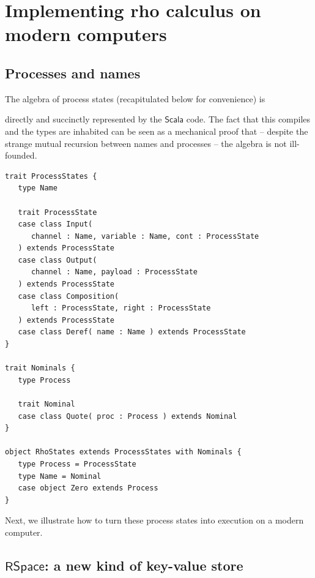 \section{Implementing rho calculus on modern computers}

\subsection{Processes and names}
The algebra of process states (recapitulated below for convenience) is 


directly and succinctly represented by the $\mathsf{Scala}$ code. The
fact that this compiles and the types are inhabited can be seen as a
mechanical proof that -- despite the strange mutual recursion between
names and processes -- the algebra is not ill-founded. 

\begin{lstlisting}
trait ProcessStates {
   type Name

   trait ProcessState
   case class Input(
      channel : Name, variable : Name, cont : ProcessState
   ) extends ProcessState
   case class Output(
      channel : Name, payload : ProcessState
   ) extends ProcessState
   case class Composition(
      left : ProcessState, right : ProcessState
   ) extends ProcessState
   case class Deref( name : Name ) extends ProcessState
}

trait Nominals {
   type Process

   trait Nominal
   case class Quote( proc : Process ) extends Nominal
}

object RhoStates extends ProcessStates with Nominals {
   type Process = ProcessState
   type Name = Nominal
   case object Zero extends Process
}
\end{lstlisting}

Next, we illustrate how to turn these process states into execution on
a modern computer.

\subsection{$\mathsf{RSpace}$: a new kind of key-value store}

